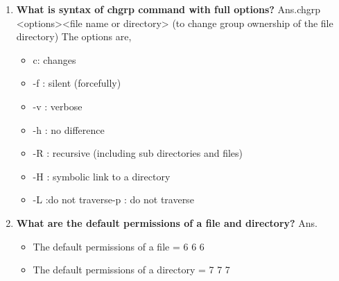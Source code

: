 \begin{enumerate}
    \item \textbf{What is syntax of chgrp command with full options?}
    \newline
    Ans.chgrp    <options><file name   or   directory>	(to change group ownership of the file directory)
    The options are,\begin{itemize}
                       \item c: changes
                       \item -f : silent  (forcefully)
                       \item -v : verbose
                       \item -h : no difference
                       \item -R : recursive  (including sub directories and files)
                       \item -H : symbolic link to a directory
                       \item -L :do not traverse-p : do not traverse
                    \end{itemize}
    
    \bigskip
    \bigskip
    
    \item \textbf{What are the default permissions of a file and directory?}
    \newline
    Ans.\begin{itemize}
            \item The default permissions of a file = 6 6 6
             \item The default permissions of a directory = 7 7 7
        \end{itemize}

    \bigskip
    \bigskip


\end{enumerate}
